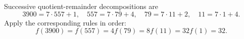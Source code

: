 Successive quotient-remainder decompositions are
\[
3900=7\cdot557+1,\quad557=7\cdot79+4,\quad79=7\cdot11+2,\quad11=7\cdot1+4.
\]
Apply the corresponding rules in order:
\[
f(3900)=f(557)=4f(79)=8f(11)=32f(1)=\boxed{32}.
\]
